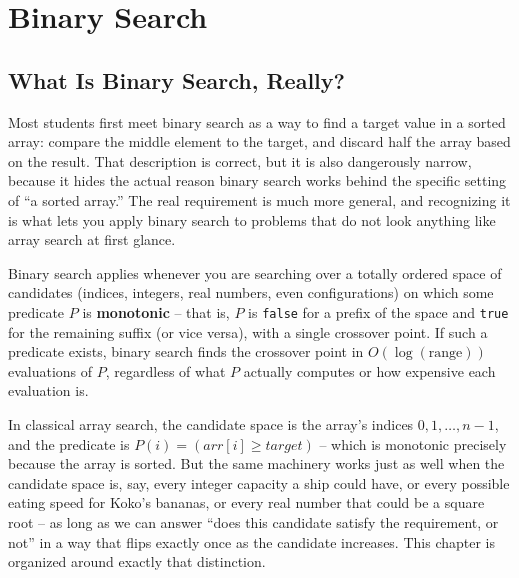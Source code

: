 \chapter{Binary Search}

\section{What Is Binary Search, Really?}
\label{sec:bs-intro}

Most students first meet binary search as a way to find a target value in a
sorted array: compare the middle element to the target, and discard half the
array based on the result. That description is correct, but it is also
dangerously narrow, because it hides the actual reason binary search works
behind the specific setting of ``a sorted array.'' The real requirement is
much more general, and recognizing it is what lets you apply binary search
to problems that do not look anything like array search at first glance.

\begin{ideabox}
Binary search applies whenever you are searching over a totally ordered
space of candidates (indices, integers, real numbers, even configurations)
on which some predicate $P$ is \textbf{monotonic} -- that is, $P$ is
\texttt{false} for a prefix of the space and \texttt{true} for the remaining
suffix (or vice versa), with a single crossover point. If such a predicate
exists, binary search finds the crossover point in $O(\log(\text{range}))$
evaluations of $P$, regardless of what $P$ actually computes or how
expensive each evaluation is.
\end{ideabox}

In classical array search, the candidate space is the array's indices
$0, 1, \dots, n-1$, and the predicate is $P(i) = (\textit{arr}[i] \ge
\textit{target})$ -- which is monotonic precisely because the array is
sorted. But the same machinery works just as well when the candidate space
is, say, every integer capacity a ship could have, or every possible eating
speed for Koko's bananas, or every real number that could be a square root --
as long as we can answer ``does this candidate satisfy the requirement, or
not'' in a way that flips exactly once as the candidate increases. This
chapter is organized around exactly that distinction.

